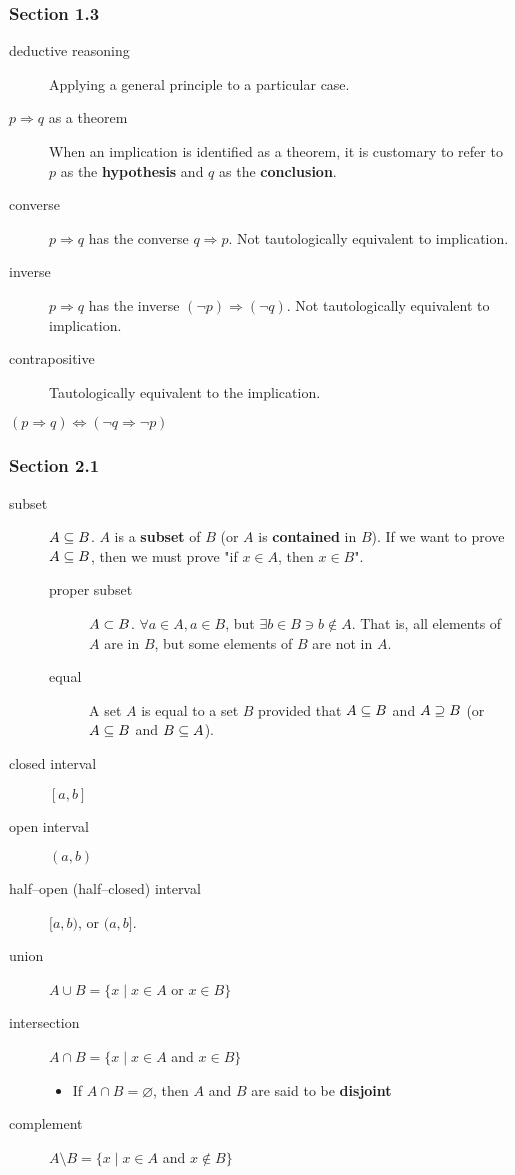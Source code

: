 \documentclass[12pt]{article}
\begin{document}
\subsubsection{Section 1.3}
\label{sec:orgb71e36c}
\begin{description}
\item[{deductive reasoning}] Applying a general principle to a particular case.
\item[{\(p\Rightarrow{}q\) as a theorem}] When an implication is identified as a theorem, it is
customary to refer to \(p\) as the \textbf{hypothesis} and \(q\) as the \textbf{conclusion}.
\item[{converse}] \(p\Rightarrow{}q\) has the converse \(q\Rightarrow{}p\). Not tautologically equivalent to
implication.
\item[{inverse}] \(p\Rightarrow{}q\) has the inverse \((\neg{}p)\Rightarrow{}(\neg{}q)\). Not tautologically
equivalent to implication.
\item[{contrapositive}] Tautologically equivalent to the implication.
\end{description}
\begin{center}
\((p\Rightarrow{}q)\Leftrightarrow(\neg{}q\Rightarrow{}\neg{}p)\)
\end{center}

\subsubsection{Section 2.1}
\label{sec:org3fc2d2a}
\begin{description}
\item[{subset}] \(A\subseteq{}B\). \(A\) is a \textbf{subset} of \(B\) (or \(A\) is \textbf{contained} in \(B\)). If we
want to prove \(A\subseteq{}B\), then we must prove "if \(x\in{}A\), then \(x\in{}B\)".
\begin{description}
\item[{proper subset}] \(A\subset{}B\). \(\forall{}a\in{}A, a\in{}B\), but \(\exists{}b\in{}B\ni{}b\notin{}A\). That is, all elements
of \(A\) are in \(B\), but some elements of \(B\) are not in \(A\).
\item[{equal}] A set \(A\) is equal to a set \(B\) provided that \(A\subseteq{}B\) and \(A\supseteq{}B\) (or
\(A\subseteq{}B\) and \(B\subseteq{}A\)).
\end{description}
\item[{closed interval}] \([a,b]\)
\item[{open interval}] \((a,b)\)
\item[{half--open (half--closed) interval}] \([a,b)\), or \((a,b]\).
\item[{union}] \(A\cup{}B=\{x\mid{}x\in{}A\) or \(x\in{}B\}\)
\item[{intersection}] \(A\cap{}B=\{x\mid{}x\in{}A\) and \(x\in{}B\}\)
\begin{itemize}
\item If \(A\cap{}B=\varnothing\), then \(A\) and \(B\) are said to be \textbf{disjoint}
\end{itemize}
\item[{complement}] \(A\setminus{}B=\{x\mid{}x\in{}A\) and \(x\notin{}B\}\)
\end{description}
\end{document}
